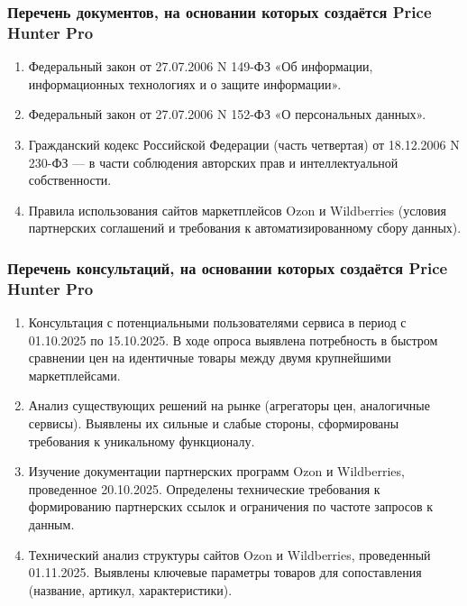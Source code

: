 \documentclass[a4paper,12pt]{article}
\begin{document}
\subsubsection{Перечень документов, на основании которых создаётся Price Hunter Pro}
\begin{enumerate}
    \item Федеральный закон от 27.07.2006 N 149-ФЗ «Об информации, информационных технологиях и о защите информации».
    \item Федеральный закон от 27.07.2006 N 152-ФЗ «О персональных данных».
    \item Гражданский кодекс Российской Федерации (часть четвертая) от 18.12.2006 N 230-ФЗ — в части соблюдения авторских прав и интеллектуальной собственности.
    \item Правила использования сайтов маркетплейсов Ozon и Wildberries (условия партнерских соглашений и требования к автоматизированному сбору данных).
\end{enumerate}

\subsubsection{Перечень консультаций, на основании которых создаётся Price Hunter Pro}
\begin{enumerate}
    \item Консультация с потенциальными пользователями сервиса в период с 01.10.2025 по 15.10.2025. В ходе опроса выявлена потребность в быстром сравнении цен на идентичные товары между двумя крупнейшими маркетплейсами.
    \item Анализ существующих решений на рынке (агрегаторы цен, аналогичные сервисы). Выявлены их сильные и слабые стороны, сформированы требования к уникальному функционалу.
    \item Изучение документации партнерских программ Ozon и Wildberries, проведенное 20.10.2025. Определены технические требования к формированию партнерских ссылок и ограничения по частоте запросов к данным.
    \item Технический анализ структуры сайтов Ozon и Wildberries, проведенный 01.11.2025. Выявлены ключевые параметры товаров для сопоставления (название, артикул, характеристики).
\end{enumerate}
\end{document}
